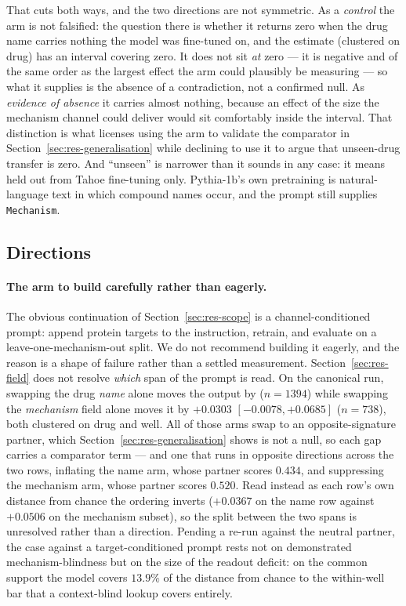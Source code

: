 That cuts both ways, and the two directions are not symmetric. As a \emph{control} the arm is not
falsified: the question there is whether it returns zero when the drug name carries nothing the
model was fine-tuned on, and the estimate  (clustered on drug) has an
interval covering zero. It does not sit \emph{at} zero --- it is negative and of the same order as
the largest effect the arm could plausibly be measuring --- so what it supplies is the absence of a
contradiction, not a confirmed null. As \emph{evidence of absence} it carries almost nothing,
because an effect of the size the mechanism channel could deliver would sit comfortably inside the
interval. That distinction is what licenses using the arm to validate the comparator in
Section~\ref{sec:res-generalisation} while declining to use it to argue that unseen-drug transfer
is zero. And ``unseen'' is narrower than it sounds in any case: it means held out from Tahoe
fine-tuning only. Pythia-1b's own pretraining is natural-language text in which compound names
occur, and the prompt still supplies \texttt{Mechanism}.

\subsection{Directions}

\paragraph{The arm to build carefully rather than eagerly.} The obvious continuation of
Section~\ref{sec:res-scope} is a channel-conditioned prompt: append protein targets to the
instruction, retrain, and evaluate on a leave-one-mechanism-out split. We do not recommend building it
eagerly, and the reason is a shape of failure rather than a settled measurement.
Section~\ref{sec:res-field} does not resolve \emph{which} span of the prompt is read. On the
canonical run, swapping the drug \emph{name} alone moves the output by
 ($n = 1394$) while swapping the \emph{mechanism} field alone moves it
by $+0.0303$ \nolinebreak[3]$[-0.0078, +0.0685]$ ($n = 738$), both clustered on drug and well. All of
those arms swap to an opposite-signature partner, which Section~\ref{sec:res-generalisation} shows is
not a null, so each gap carries a comparator term --- and one that runs in opposite directions
across the two rows, inflating the name arm, whose partner scores $0.434$, and suppressing the
mechanism arm, whose partner scores $0.520$. Read instead as each row's own distance from chance
the ordering inverts ($+0.0367$ on the name row against $+0.0506$ on the mechanism subset), so the
split between the two spans is unresolved rather than a direction. Pending a re-run against the neutral partner, the case against a
target-conditioned prompt rests not on demonstrated mechanism-blindness but on the size of the
readout deficit: on the common support the model covers $13.9\%$ of the distance from chance to the
within-well bar that a context-blind lookup covers entirely.

